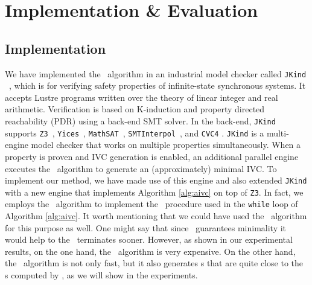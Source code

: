 \section{Implementation \& Evaluation}
\label{sec:impl}
\subsection{Implementation}
We have implemented the \aivcalg ~algorithm
in an industrial model checker called \texttt{JKind} ~\cite{jkind},
which is for verifying safety properties of  infinite-state synchronous systems.
It accepts Lustre programs \cite{Halbwachs91:lustre}
written over the theory of linear integer and real arithmetic.
Verification is based on K-induction and property directed reachability (PDR) using a back-end SMT solver.
In the
back-end, \texttt{JKind} supports \texttt{Z3}~\cite{DeMoura08:z3},
\texttt{Yices}~\cite{Dutertre06:yices}, \texttt{MathSAT}~\cite{Cimatti2013:MathSAT},
\texttt{SMTInterpol}~\cite{Christ2012:SMTInterpol}, and \texttt{CVC4} \cite{barrett2011cvc4}. \texttt{JKind} is a multi-engine model checker that works on multiple properties simultaneously. When a property is
proven and IVC generation is enabled, an additional parallel engine
executes the \ucalg ~algorithm \cite{Ghass16} to generate an (approximately) minimal IVC. To implement our method, we have made use of this engine and also extended \texttt{JKind} with a new engine that
implements Algorithm \ref{alg:aivc} on top of \texttt{Z3}.
In fact, we employs the \ucalg ~algorithm to implement the \getivc\ procedure used in the \texttt{while} loop of Algorithm \ref{alg:aivc}. It worth mentioning that we could have used the \ucbfalg ~algorithm for this purpose as well.
One might say that since \ucbfalg ~guarantees minimality it would help to the \aivcalg ~terminates sooner.
However, as shown in our experimental results, on the one hand, the \ucbfalg ~algorithm is very expensive. On the other hand, the \ucalg ~algorithm is not only fast, but it also generates \ivc s that are 
quite close to the \mivc s computed by \ucbfalg , as we will show in the experiments.   

